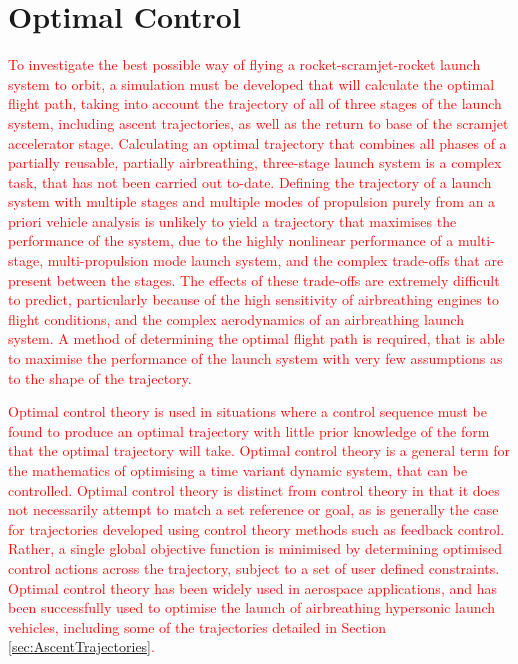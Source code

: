


\section{Optimal Control}\label{sec:Optimisation}





\textcolor{red}{To investigate the best possible way of flying a rocket-scramjet-rocket launch system to orbit, a simulation must be developed that will calculate the optimal flight path, taking into account the trajectory of all of three stages of the launch system, including ascent trajectories, as well as the return to base of the scramjet accelerator stage. Calculating an optimal trajectory that combines all phases of a partially reusable, partially airbreathing, three-stage launch system is a complex task, that has not been carried out to-date.
Defining the trajectory of a launch system with multiple stages and multiple modes of propulsion purely from an a priori vehicle analysis is unlikely to yield a trajectory that maximises the performance of the system, due to the highly nonlinear performance of a multi-stage, multi-propulsion mode launch system, and the complex trade-offs that are present between the stages. The effects of these trade-offs are extremely difficult to predict, particularly because of the high sensitivity of airbreathing engines to flight conditions, and the complex aerodynamics of an airbreathing launch system. 
A method of determining the optimal flight path is required, that is able to maximise the performance of the launch system with very few assumptions as to the shape of the trajectory. 
}

\textcolor{red}{
Optimal control theory is used in situations where a control sequence must be found to produce an optimal trajectory with little prior knowledge of the form that the optimal trajectory will take. 
Optimal control theory is a general term for the mathematics of optimising a time variant dynamic system, that can be controlled. 
Optimal control theory is distinct from control theory in that it does not necessarily attempt to match a set reference or goal, as is generally the case for trajectories developed using control theory methods such as feedback control. Rather, a single global objective function is minimised by determining optimised control actions across the trajectory, subject to a set of user defined constraints.  
Optimal control theory has been widely used in aerospace applications, and has been successfully used to optimise the launch of airbreathing hypersonic launch vehicles\cite{Powell1991,Lu1993,Trefny1999,Roche2000,Pescetelli2012,Young2006}, including some of the trajectories detailed in Section \ref{sec:AscentTrajectories}. 
}

